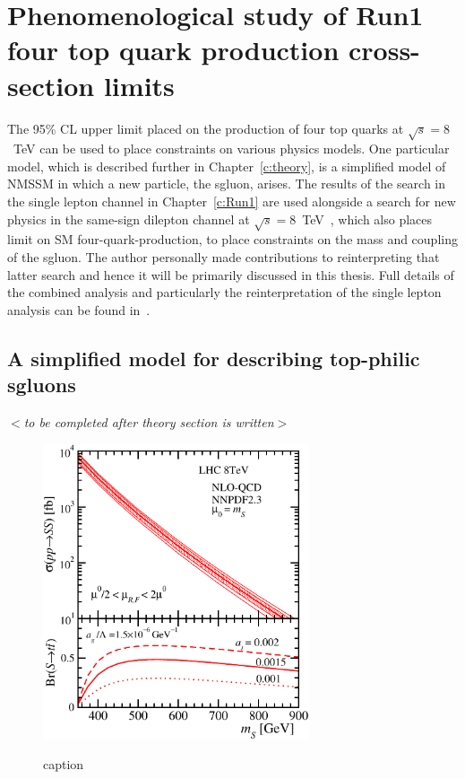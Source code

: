 \chapter{Phenomenological study of Run1 four top quark production cross-section limits}
\label{c:pheno}

The 95\% CL upper limit placed on the production of four top quarks at $\sqrt{s}=8$~TeV can be used to place constraints on various physics models. One particular model, which is described further in Chapter~\ref{c:theory}, is a simplified model of NMSSM in which a new particle, the sgluon, arises. The results of the search in the single lepton channel in Chapter~\ref{c:Run1} are used alongside a search for new physics in the same-sign dilepton channel at $\sqrt{s}=8$~TeV~\cite{Chatrchyan:2013fea}, which also places limit on SM four-quark-production, to place constraints on the mass and coupling of the sgluon. The author personally made contributions to reinterpreting that latter search and hence it will be primarily discussed in this thesis. Full details of the combined analysis and particularly the reinterpretation of the single lepton analysis can be found in~\cite{Beck201548}.

\section{A simplified model for describing top-philic sgluons }
$<$\emph{to be completed after theory section is written}$>$
\begin{figure}[h!]
\centering
    \includegraphics[width=0.7\textwidth]{images/Pheno/xsec.pdf}\\
    \caption{caption}
    \label{fig:sgluonxsec}
\end{figure}

